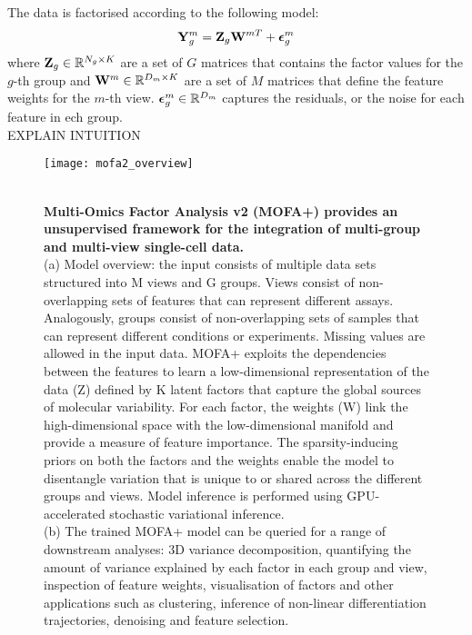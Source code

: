 The data is factorised according to the following model:
\begin{equation} \label{mofa_master_equation}
	\mathbf{Y}^{m}_{g} = \mathbf{Z}_{g} \mathbf{W}^{mT} + \mbox{\boldmath $\epsilon$}^{m}_{g}
\end{equation}
where  ${\bf Z}_{g} \in \mathbb{R}^{N_{g} \times K}$ are a set of $G$ matrices that contains the factor values for the $g$-th group and ${\bf W}^{m} \in \mathbb{R}^{D_m \times K}$ are a set of $M$ matrices that define the feature weights for the $m$-th view. $\mbox{\boldmath $\epsilon$}^{m}_{g} \in \mathbb{R}^{D_m}$ captures the residuals, or the noise for each feature in ech group.\\


EXPLAIN INTUITION

\begin{figure}[H]
	\centering
	\texttt{[image: mofa2\_overview]}
	\caption[]{ \\
	\textbf{Multi-Omics Factor Analysis v2 (MOFA+) provides an unsupervised framework for the integration of multi-group and multi-view single-cell data.} \\
	(a) Model overview: the input consists of multiple data sets structured into M views and G groups. Views consist of non-overlapping sets of features that can represent different assays. Analogously, groups consist of non-overlapping sets of samples that can represent different conditions or experiments. Missing values are allowed in the input data. MOFA+ exploits the dependencies between the features to learn a low-dimensional representation of the data (Z) defined by K latent factors that capture the global sources of molecular variability. For each factor, the weights (W) link the high-dimensional space with the low-dimensional manifold and provide a measure of feature importance. The sparsity-inducing priors on both the factors and the weights enable the model to disentangle variation that is unique to or shared across the different groups and views. Model inference is performed using GPU-accelerated stochastic variational inference. \\
	(b) The trained MOFA+ model can be queried for a range of downstream analyses: 3D variance decomposition, quantifying the amount of variance explained by each factor in each group and view, inspection of feature weights, visualisation of factors and other applications such as clustering, inference of non-linear differentiation trajectories, denoising and feature selection.
	}
	\label{fig:mofa2_overview}
\end{figure}



